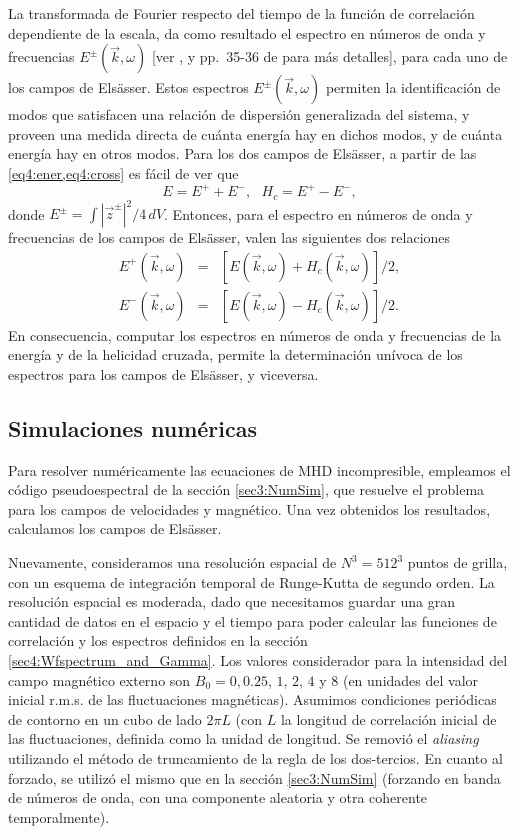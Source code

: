 La transformada de Fourier respecto del tiempo de la función de
correlación dependiente de la escala, da como resultado el espectro en
números de onda y frecuencias $E^\pm(\vec{k},\omega)$
[ver \cite{clark_di_leoni_quantification_2014,
  clark_di_leoni_spatio-temporal_2015}, y pp.~35-36 de  
\cite{batchelor_theory_1953} para más detalles], para cada uno de los campos de
Els\"asser. Estos espectros $E^\pm(\vec{k},\omega)$ permiten la
identificación de modos que satisfacen una relación de dispersión
generalizada del sistema, y proveen una medida directa de cuánta
energía hay en dichos modos, y de cuánta energía hay en otros
modos. Para los dos campos de Els\"asser, a partir de
las \cref{eq4:ener,eq4:cross} es fácil de ver que
\begin{equation}
  E = E^+ + E^- , \,\,\,\, H_c = E^+ - E^- ,
\end{equation}
donde $E^\pm = \int |\vec{z}^\pm|^2/4 \, dV$. Entonces, para el
espectro en números de onda y frecuencias de los campos de Els\"asser,
valen las siguientes dos relaciones
\begin{eqnarray}
  E^+(\vec{k},\omega) &=& [E(\vec{k},\omega) + H_c(\vec{k},\omega)]/2, \\
  E^-(\vec{k},\omega) &=& [E(\vec{k},\omega) - H_c(\vec{k},\omega)]/2.
\end{eqnarray}
En consecuencia, computar los espectros en números de onda y
frecuencias de la energía y de la helicidad cruzada, permite la
determinación unívoca de los espectros para los campos de Els\"asser,
y viceversa.


\subsection{Simulaciones numéricas}\label{sec4:NumSim}

Para resolver numéricamente las ecuaciones de MHD incompresible,
empleamos el código pseudoespectral de la sección \ref{sec3:NumSim}, que
resuelve el problema para los campos de velocidades y magnético. Una
vez obtenidos los resultados, calculamos los campos de Els\"asser.

Nuevamente, consideramos una resolución espacial de $N^3 = 512^3$
puntos de grilla, con un esquema de integración temporal de
Runge-Kutta de segundo orden. La resolución espacial es moderada, dado
que necesitamos guardar una gran cantidad de datos en el espacio y el
tiempo para poder calcular las funciones de correlación y los
espectros definidos en la sección
\ref{sec4:Wfspectrum_and_Gamma}. Los valores considerador para la
intensidad del campo magnético externo son $B_0 = 0, 0.25$, $1$, $2$,
$4$ y $8$ (en unidades del valor inicial r.m.s. de las fluctuaciones
magnéticas). Asumimos condiciones periódicas de contorno en un cubo de
lado $2\pi L$ (con $L$ la longitud de correlación inicial de las
fluctuaciones, definida como la unidad de longitud. Se removió el
\textit{aliasing} utilizando el método de truncamiento de la regla de
los dos-tercios. En cuanto al forzado, se utilizó el mismo que en
la sección \ref{sec3:NumSim} (forzando en banda de números de onda, con una
componente aleatoria y otra coherente temporalmente).



